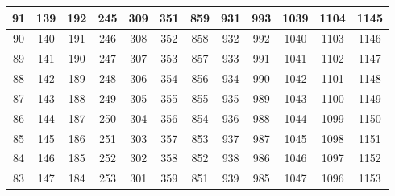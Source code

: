 \begin{center}
{\begin{tabular} {| c | c | c | c | c | c | c | c | c | c | c | c | }
 91                      & 139                      &  192 & 245 & 309                      & 351                      & 859 & 931                      &  993                      & 1039 & 1104                       & 1145                      \\ \hline
 90                      & 140                      &  191 & 246 & 308                      & 352                      & 858 & 932                      &  992                      & 1040 & 1103                       & 1146                      \\ \hline
 89                      & 141                      &  190 & 247 & 307                      & 353                      & 857 & 933                      &  991                      & 1041 & 1102                       & 1147                      \\ \hline
 88                      & 142                      &  189 & 248 & 306                      & 354                      & 856 & 934                      &  990                      & 1042 & 1101                       & 1148                      \\ \hline
 87                      & 143                      &  188 & 249 & 305                      & 355                      & 855 & 935                      &  989                      & 1043 & 1100                       & 1149                      \\ \hline
 86                      & 144                      &  187 & 250 & 304                      & 356                      & 854 & 936                      &  988                      & 1044 & 1099                       & 1150                      \\ \hline
 85                      & 145                      &  186 & 251 & 303                      & 357                      & 853 & 937                      &  987                      & 1045 & 1098                       & 1151                      \\ \hline
 84                      & 146                      &  185 & 252 & 302                      & 358                      & 852 & 938                      &  986                      & 1046 & 1097                       & 1152                      \\ \hline
 83                      & 147                      &  184 & 253 & 301                      & 359                      & 851 & 939                      &  985                      & 1047 & 1096                       & 1153                      \\ \hline

\end{tabular}}
\end{center}
